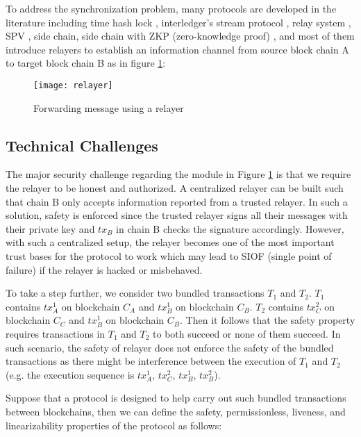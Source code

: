 To address the synchronization problem, many protocols are developed in the literature including time hash lock \cite{poon2016bitcoin}, interledger’s stream protocol \cite{zhang2021enabling}, relay system \cite{lys2021r}, SPV \cite{nakamoto2008bitcoin}, side chain\cite{singh2020sidechain,deng2018sidechain}, side chain with ZKP (zero-knowledge proof) \cite{sidechainzkp}, and most of them introduce relayers \cite{sun2020collaborative-relay, warren20170x-relay} to establish an information channel from source block chain A to target block chain B as in figure \ref{relayer-connection}:
\begin{figure}[!ht]
\texttt{[image: relayer]}
\caption{Forwarding message using a relayer}
\label{relayer-connection}
\end{figure}

\subsection{Technical Challenges}
The major security challenge regarding the module in Figure \ref{relayer-connection} is that we require the relayer to be honest and authorized. A centralized relayer can be built such that chain B only accepts information reported from a trusted relayer. In such a solution, safety is enforced since the trusted relayer signs all their messages with their private key and $tx_B$ in chain B checks the signature accordingly. However, with such a centralized setup, the relayer becomes one of the most important trust bases for the protocol to work which may lead to SIOF (single point of failure) if the relayer is hacked or misbehaved.


To take a step further, we consider two bundled transactions $T_1$ and $T_2$. $T_1$ contains $tx_A^1$ on blockchain $C_A$ and $tx_B^1$ on blockchain $C_B$. $T_2$ contains $tx^2_C$ on blockchain $C_C$ and $tx_B^1$ on blockchain $C_B$. Then it follows that the safety property requires transactions in $T_1$ and $T_2$ to both succeed or none of them succeed. In such scenario, the safety of relayer does not enforce the safety of the bundled transactions as there might be interference between the execution of $T_1$ and $T_2$ (e.g. the execution sequence is $tx_A^1$, $tx_C^2$, $tx_B^1$, $tx_B^2$). 

Suppose that a protocol is designed to help carry out such bundled transactions between blockchains, then we can define the safety, permissionless, liveness, and linearizability properties of the protocol as follows:

